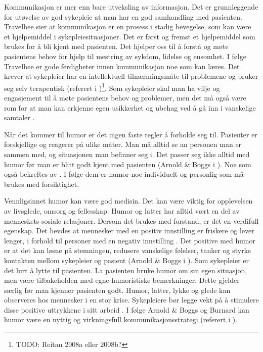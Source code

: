 Kommunikasjon er mer enn bare utveksling av informasjon. Det er grunnleggende
for utøvelse av god sykepleie at man har en god samhandling med pasienten.
Travelbee sier at kommunikasjon er en prosess i stadig bevegelse, som kan være
et hjelpemiddel i sykepleiesituasjoner. Det er først og fremst et hjelpemiddel
som brukes for å bli kjent med pasienten. Det hjelper oss til å forstå og møte
pasientens behov for hjelp til mestring av sykdom, lidelse og ensomhet. I følge
Travelbee er gode ferdigheter innen kommunikasjon noe som kan læres. Det krever
at sykepleier har en intellektuell tilnærmingsmåte til problemene og bruker seg
selv terapeutisk (referert i
)\footnote{TODO: Reitan 2008a eller
2008b?}. Som sykepleier skal man ha vilje og engasjement til å møte pasientens
behov og problemer, men det må også være rom for at man kan erkjenne egen
usikkerhet og ubehag ved å gå inn i vanskelige samtaler
\cite[s.~81]{reitan2008.kommunikasjon}.

Når det kommer til humor er det ingen faste regler å forholde seg til.
Pasienter er forskjellige og reagerer på ulike måter. Man må alltid se an
personen man er sammen med, og situasjonen man befinner seg i. Det passer seg
ikke alltid med humor før man er blitt godt kjent med pasienten (Arnold \&{}
Boggs i ). Noe som også bekreftes av
. I følge dem er humor noe individuelt og personlig
som må brukes med forsiktighet.

Vennligsinnet humor kan være god medisin. Det kan være viktig for opplevelsen
av livsglede, omsorg og fellesskap. Humor og latter har alltid vært en del av
menneskets sosiale relasjoner. Dersom det brukes med forstand, er det en
verdifull egenskap. Det hevdes at mennesker med en positiv innstilling er
friskere og lever lenger, i forhold til personer med en negativ innstilling
\cite[s.~55]{bohn2000}. Det positive med humor er at det kan løsne på
stemningen, redusere vanskelige følelser, tanker og styrke kontakten mellom
sykepleier og pasient (Arnold \&{} Boggs i ). Som
sykepleier er det lurt å lytte til pasienten. La pasienten bruke humor om sin
egen situasjon, men være tilbakeholden med egne humoristiske bemerkninger.
Dette gjelder særlig før man kjenner pasienten godt. Humor, latter, lykke og
glede kan observeres hos mennesker i en stor krise. Sykepleiere bør legge vekt
på å stimulere disse positive uttrykkene i sitt arbeid \cite[s.~169]{wist2002}.
I følge Arnold \&{} Boggs og Burnard kan humor være en nyttig og virkningsfull
kommunikasjonsstrategi (referert i ).

